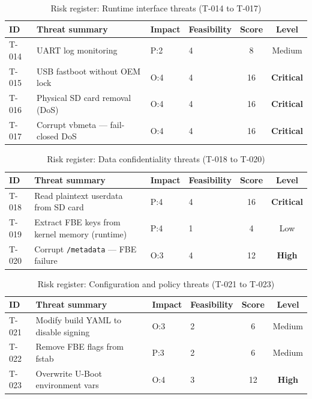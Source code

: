 \begin{table}[h]
\centering
\caption{Risk register: Runtime interface threats (T-014 to T-017)}
\label{tab:risk_iface}
\small
\begin{tabularx}{\textwidth}{p{0.8cm} >{\raggedright\arraybackslash}X p{1.5cm} p{1.5cm} c c}
\toprule
\textbf{ID} & \textbf{Threat summary} & \textbf{Impact} & \textbf{Feasibility} & \textbf{Score} & \textbf{Level} \\
\midrule
T-014 & UART log monitoring               & P:2 & 4 & 8 & Medium \\
T-015 & USB fastboot without OEM lock     & O:4 & 4 & 16 & \textbf{Critical} \\
T-016 & Physical SD card removal (DoS)    & O:4 & 4 & 16 & \textbf{Critical} \\
T-017 & Corrupt vbmeta --- fail-closed DoS & O:4 & 4 & 16 & \textbf{Critical} \\
\bottomrule
\end{tabularx}
\end{table}

\begin{table}[h]
\centering
\caption{Risk register: Data confidentiality threats (T-018 to T-020)}
\label{tab:risk_data}
\small
\begin{tabularx}{\textwidth}{p{0.8cm} >{\raggedright\arraybackslash}X p{1.5cm} p{1.5cm} c c}
\toprule
\textbf{ID} & \textbf{Threat summary} & \textbf{Impact} & \textbf{Feasibility} & \textbf{Score} & \textbf{Level} \\
\midrule
T-018 & Read plaintext userdata from SD card          & P:4 & 4 & 16 & \textbf{Critical} \\
T-019 & Extract FBE keys from kernel memory (runtime) & P:4 & 1 &  4 & Low \\
T-020 & Corrupt \texttt{/metadata} --- FBE failure    & O:3 & 4 & 12 & \textbf{High} \\
\bottomrule
\end{tabularx}
\end{table}

\begin{table}[h]
\centering
\caption{Risk register: Configuration and policy threats (T-021 to T-023)}
\label{tab:risk_config}
\small
\begin{tabularx}{\textwidth}{p{0.8cm} >{\raggedright\arraybackslash}X p{1.5cm} p{1.5cm} c c}
\toprule
\textbf{ID} & \textbf{Threat summary} & \textbf{Impact} & \textbf{Feasibility} & \textbf{Score} & \textbf{Level} \\
\midrule
T-021 & Modify build YAML to disable signing & O:3 & 2 & 6 & Medium \\
T-022 & Remove FBE flags from fstab          & P:3 & 2 & 6 & Medium \\
T-023 & Overwrite U-Boot environment vars    & O:4 & 3 & 12 & \textbf{High} \\
\bottomrule
\end{tabularx}
\end{table}


